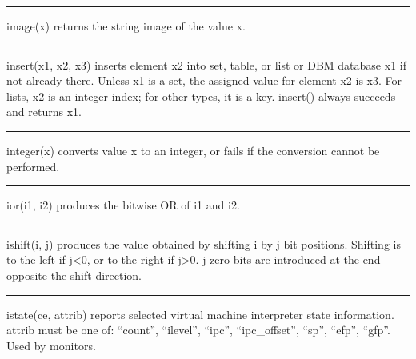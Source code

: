 \bigskip\hrule\vspace{0.1cm}

\noindent
{}\textsf{image(x)} returns the string image of the value
\textsf{x}.

\bigskip\hrule\vspace{0.1cm}

\noindent
\textsf{insert(x1, x2, x3)} inserts element \textsf{x2} into set, table,
or list or DBM database \textsf{x1} if not already there. Unless
\textsf{x1} is a set, the assigned value for element \textsf{x2} is
\textsf{x3}. For lists, \textsf{x2} is an integer index; for other
types, it is a key. \textsf{insert()} always succeeds
and returns \textsf{x1}.

\bigskip\hrule\vspace{0.1cm}

\noindent
{}\textsf{integer(x)} converts value \textsf{x}
to an integer, or fails if the conversion cannot be performed.

\bigskip\hrule\vspace{0.1cm}

\noindent
{}\textsf{ior(i1, i2)} produces the bitwise OR of
\textsf{i1} and \textsf{i2}.

\bigskip\hrule\vspace{0.1cm}

\noindent
{}\textsf{ishift(i, j)} produces the value obtained by
shifting \textsf{i} by \textsf{j} bit positions. Shifting is to the
left if \textsf{j{\textless}0}, or to the right if
\textsf{j{\textgreater}0}. \textsf{j} zero bits are introduced at the
end opposite the shift direction.

\bigskip\hrule\vspace{0.1cm}

\noindent
\textsf{istate(ce, attrib)} reports selected virtual machine interpreter
state information. \textsf{attrib} must be one of:
\textsf{{\textquotedblleft}count{\textquotedblright}},
\textsf{{\textquotedblleft}ilevel{\textquotedblright}},
\textsf{{\textquotedblleft}ipc{\textquotedblright}},
\textsf{{\textquotedblleft}ipc\_offset{\textquotedblright}},
\textsf{{\textquotedblleft}sp{\textquotedblright}},
\textsf{{\textquotedblleft}efp{\textquotedblright}},
\textsf{{\textquotedblleft}gfp{\textquotedblright}}. Used by monitors.

